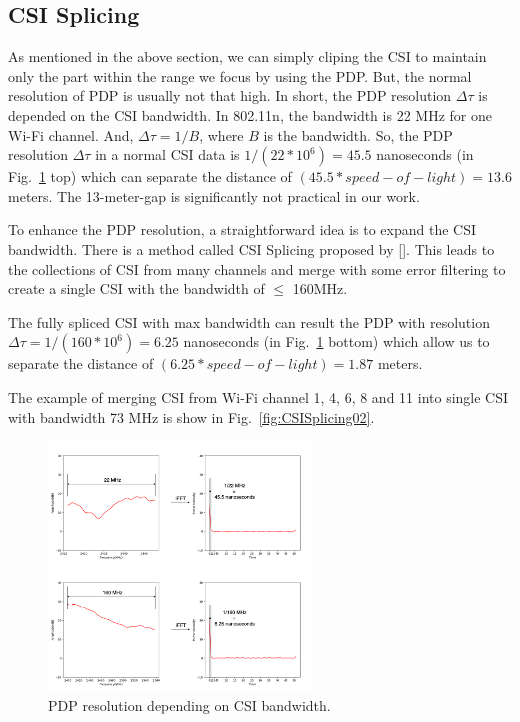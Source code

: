\documentclass[conference]{IEEEtran}
\begin{document}
	 \subsection{CSI Splicing}
	
	As mentioned in the above section, we can simply cliping the CSI to maintain only the part within the range we focus by using the PDP. But, the normal resolution of PDP is usually not that high. In short, the PDP resolution $\Delta\tau$ is depended on the CSI bandwidth. In 802.11n, the bandwidth is 22 MHz for one Wi-Fi channel. And, $\Delta\tau = 1/B$, where $B$ is the bandwidth.
	So, the PDP resolution $\Delta\tau$ in a normal CSI data is $1/(22*10^6)= 45.5$ nanoseconds (in Fig.~\ref{fig:CSISplicing01} top) which can separate the distance of
	$(45.5*speed-of-light)= 13.6$ meters. The 13-meter-gap is significantly not practical in our work.
	
	To enhance the PDP resolution, a straightforward idea is to expand the CSI bandwidth. There is a method called CSI Splicing proposed by []. This leads to the collections of CSI from many channels and merge with some error filtering to create a single CSI with the bandwidth of $\le$ 160MHz. 
	
	
	The fully spliced CSI with max bandwidth can result the PDP with resolution $\Delta\tau=1/(160*10^6)=6.25$  nanoseconds (in Fig.~\ref{fig:CSISplicing01} bottom) which allow us to separate the distance of
	$(6.25*speed-of-light)= 1.87$ meters.
	
		The example of merging CSI from Wi-Fi channel 1, 4, 6, 8 and 11 into single CSI with bandwidth 73 MHz is show in Fig.~\ref{fig:CSISplicing02}.
	
	\begin{figure}[htbp]
		
		\centerline{\includegraphics[width=70mm,scale=0.5]{CSISplicing01.png}}
		\caption{PDP resolution depending on CSI bandwidth.}
		\label{fig:CSISplicing01}
	\end{figure}
\end{document}
